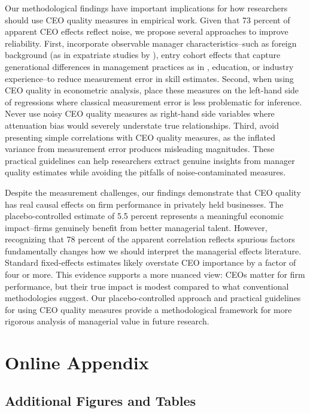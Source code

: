 \documentclass[11pt,a4paper]{article}
\begin{document}
Our methodological findings have important implications for how researchers should use CEO quality measures in empirical work. Given that 73 percent of apparent CEO effects reflect noise, we propose several approaches to improve reliability. First, incorporate observable manager characteristics\---such as foreign background (as in expatriate studies by \citet{Koren2023expat}), entry cohort effects that capture generational differences in management practices as in \citet{koren2024managers}, education, or industry experience\---to reduce measurement error in skill estimates. Second, when using CEO quality in econometric analysis, place these measures on the left-hand side of regressions where classical measurement error is less problematic for inference. Never use noisy CEO quality measures as right-hand side variables where attenuation bias would severely understate true relationships. Third, avoid presenting simple correlations with CEO quality measures, as the inflated variance from measurement error produces misleading magnitudes. These practical guidelines can help researchers extract genuine insights from manager quality estimates while avoiding the pitfalls of noise-contaminated measures.

Despite the measurement challenges, our findings demonstrate that CEO quality has real causal effects on firm performance in privately held businesses. The placebo-controlled estimate of 5.5 percent represents a meaningful economic impact\---firms genuinely benefit from better managerial talent. However, recognizing that 78 percent of the apparent correlation reflects spurious factors fundamentally changes how we should interpret the managerial effects literature. Standard fixed-effects estimates likely overstate CEO importance by a factor of four or more. This evidence supports a more nuanced view: CEOs matter for firm performance, but their true impact is modest compared to what conventional methodologies suggest. Our placebo-controlled approach and practical guidelines for using CEO quality measures provide a methodological framework for more rigorous analysis of managerial value in future research.





\appendix
\section{Online Appendix}

\subsection{Additional Figures and Tables}
\end{document}
